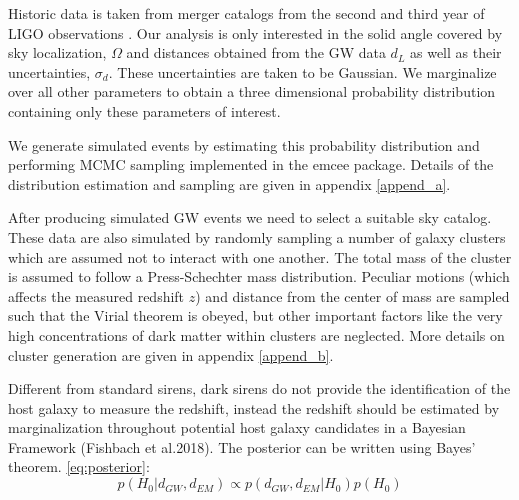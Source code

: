 
Historic data is taken from merger catalogs from the second and third year of LIGO observations \cite{GWTC_2,GWTC_3}. Our analysis is only interested in the solid angle covered by sky localization, $\Omega$ and distances obtained from the GW data $d_L$ as well as their uncertainties, $\sigma_d$. These uncertainties are taken to be Gaussian. We marginalize over all other parameters to obtain a three dimensional probability distribution containing only these parameters of interest.

We generate simulated events by estimating this probability distribution and performing MCMC sampling implemented in the emcee package. Details of the distribution estimation and sampling are given in appendix \ref{append_a}.

After producing simulated GW events we need to select a suitable sky catalog. These data are also simulated by randomly sampling a number of galaxy clusters which are assumed not to interact with one another. The total mass of the cluster is assumed to follow a Press-Schechter mass distribution\cite{Press_1974}. Peculiar motions (which affects the measured redshift $z$) and distance from the center of mass are sampled such that the Virial theorem is obeyed, but other important factors like the very high concentrations of dark matter within clusters are neglected. More details on cluster generation are given in appendix \ref{append_b}.
    

Different from standard sirens, dark sirens do not provide the identification of the host galaxy to measure the redshift, instead the redshift should be estimated by marginalization throughout potential host galaxy candidates in a Bayesian Framework (Fishbach et al.2018)\cite{Fishbach_2019}. The posterior can be written using Bayes' theorem. 
\ref{eq:posterior}: 
\begin{equation}
    p(H_0|d_{GW}, d_{EM})\propto p(d_{GW}, d_{EM}|H_0)p(H_0)
    \label{eq:posterior}
\end{equation}

